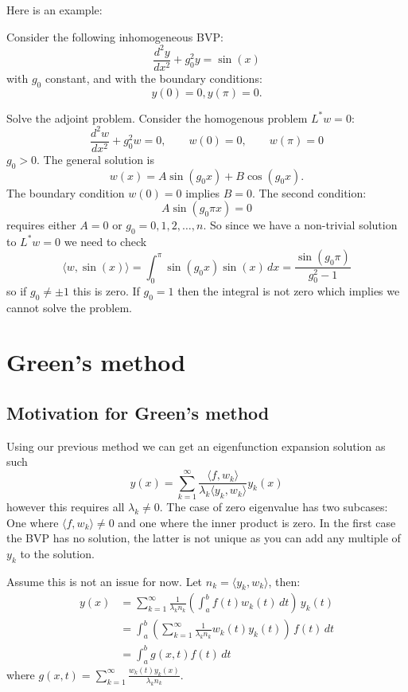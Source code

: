 \documentclass[10pt, a4paper]{article}
\begin{document}
Here is an example:

\begin{example}
    Consider the following inhomogeneous BVP:
    \[
    \frac{d ^ 2y}{dx ^ 2} + g_0 ^ 2y = \sin(x)
    \]
    with $g_0$ constant,
    and with the boundary conditions:
    \[
    y(0) = 0, y(\pi) = 0.
    \]

    \begin{solution}
        Solve the adjoint problem.
        Consider the homogenous problem $L ^ {*}w = 0$:
        \[
        \frac{d ^ 2w}{dx ^ 2} + g_0 ^ 2w = 0,\qquad w(0) = 0,\qquad w(\pi) = 0
        \]
        $g_0 > 0$.
        The general solution is
        \[
        w(x) = A\sin(g_0x) + B\cos(g_0x).
        \]
        The boundary condition $w(0) = 0$ implies $B = 0$.
        The second condition:
        \[
        A\sin(g_0\pi x) = 0
        \]
        requires either $A = 0$ or $g_0 = 0, 1, 2, \dotsc, n$.
        So since we have a non-trivial solution to $L ^ {*}w = 0$ we need to check
        \[
        \langle w,\sin(x)\rangle = \int_{0}^{\pi}\sin(g_0x)\sin(x)\,dx = \frac{\sin(g_0\pi)}{g_0 ^ 2 - 1}
        \]
        so if $g_0 \neq \pm 1$ this is zero.
        If $g_0 = 1$ then the integral is not zero which implies we cannot solve the problem.
    \end{solution}
\end{example}

\newpage

\section{Green's method}

\subsection{Motivation for Green's method}
Using our previous method we can get an eigenfunction expansion solution as such
\[
y(x) = \sum_{k = 1}^{\infty}\frac{\langle f, w_k\rangle}{\lambda_k\langle y_k, w_k\rangle}y_k(x)
\]
however this requires all $\lambda_k \neq 0$.
The case of zero eigenvalue has two subcases:
One where $\langle f, w_k\rangle \neq 0$ and one where the inner product is zero.
In the first case the BVP has no solution,
the latter is not unique as you can add any multiple of $y_k$ to the solution.

Assume this is not an issue for now.
Let $n_k = \langle y_k, w_k\rangle$,
then:
\begin{align*}
    y(x) &= \sum_{k = 1}^{\infty}\frac{1}{\lambda_kn_k}\left(\int_{a}^{b}f(t)w_k(t)\,dt\right)\,y_k(t) \\
    &= \int_{a}^{b}\left(\sum_{k = 1}^{\infty}\frac{1}{\lambda_kn_k}w_k(t)y_k(t)\right)\,f(t)\,dt \\
    &= \int_{a}^{b}g(x, t)f(t)\,dt
\end{align*}
where $g(x, t) = \sum_{k = 1}^{\infty}\frac{w_k(t)y_k(x)}{\lambda_kn_k}$.
\end{document}
